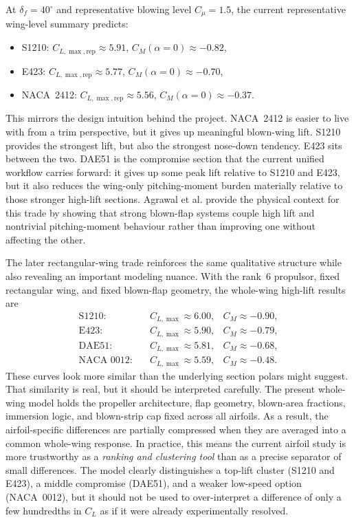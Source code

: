 \documentclass[conf]{new-aiaa}
\begin{document}
At \(\delta_f = 40^\circ\) and representative blowing level \(C_\mu=1.5\), the current representative wing-level summary predicts:
\begin{itemize}
\item S1210: \(C_{L,\max,\mathrm{rep}} \approx 5.91\), \(C_M(\alpha=0) \approx -0.82\),
\item E423: \(C_{L,\max,\mathrm{rep}} \approx 5.77\), \(C_M(\alpha=0) \approx -0.70\),
\item NACA~2412: \(C_{L,\max,\mathrm{rep}} \approx 5.56\), \(C_M(\alpha=0) \approx -0.37\).
\end{itemize}

This mirrors the design intuition behind the project. NACA~2412 is easier to live with from a trim perspective, but it gives up meaningful blown-wing lift. S1210 provides the strongest lift, but also the strongest nose-down tendency. E423 sits between the two. DAE51 is the compromise section that the current unified workflow carries forward: it gives up some peak lift relative to S1210 and E423, but it also reduces the wing-only pitching-moment burden materially relative to those stronger high-lift sections. Agrawal et al. provide the physical context for this trade by showing that strong blown-flap systems couple high lift and nontrivial pitching-moment behaviour rather than improving one without affecting the other.\cite{Agrawal2019}

The later rectangular-wing trade reinforces the same qualitative structure while also revealing an important modeling nuance. With the rank~6 propulsor, fixed rectangular wing, and fixed blown-flap geometry, the whole-wing high-lift results are
\begin{align}
\text{S1210:} \quad & C_{L,\max} \approx 6.00, & C_M \approx -0.90, \\
\text{E423:} \quad & C_{L,\max} \approx 5.90, & C_M \approx -0.79, \\
\text{DAE51:} \quad & C_{L,\max} \approx 5.81, & C_M \approx -0.68, \\
\text{NACA~0012:} \quad & C_{L,\max} \approx 5.59, & C_M \approx -0.48.
\end{align}
These curves look more similar than the underlying section polars might suggest. That similarity is real, but it should be interpreted carefully. The present whole-wing model holds the propeller architecture, flap geometry, blown-area fractions, immersion logic, and blown-strip cap fixed across all airfoils. As a result, the airfoil-specific differences are partially compressed when they are averaged into a common whole-wing response. In practice, this means the current airfoil study is more trustworthy as a \emph{ranking and clustering tool} than as a precise separator of small differences. The model clearly distinguishes a top-lift cluster (S1210 and E423), a middle compromise (DAE51), and a weaker low-speed option (NACA~0012), but it should not be used to over-interpret a difference of only a few hundredths in \(C_L\) as if it were already experimentally resolved.
\end{document}
